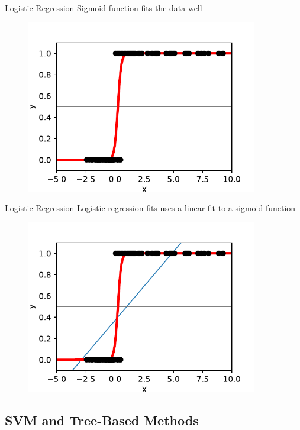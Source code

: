 \documentclass[10pt]{beamer}
\begin{document}
\begin{frame}{Logistic Regression}
Sigmoid function fits the data well 
	\begin{figure}	
		\includegraphics[width=0.9\textwidth, center, trim=0cm 0cm 0 0cm]{images/logit_curve_data.pdf}
	\end{figure}
\end{frame}

\begin{frame}{Logistic Regression}
Logistic regression fits uses a linear fit to a sigmoid function
	\begin{figure}	
		\includegraphics[width=0.9\textwidth, center, trim=0cm 0cm 0 0cm]{images/logit_curve_line_data.pdf}
	\end{figure}
\end{frame}

\subsection{SVM and Tree-Based Methods}
\end{document}
